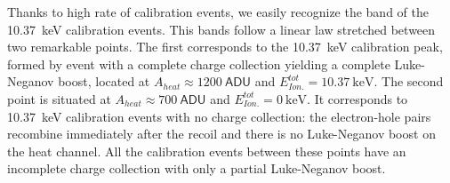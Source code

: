 Thanks to high rate of calibration events, we easily recognize the band of the \SI{10.37}{\kilo\eV} calibration events. This bands follow a linear law stretched between two remarkable points. The first corresponds to the \SI{10.37}{\kilo\eV} calibration peak, formed by event with a complete charge collection yielding a complete Luke-Neganov boost, located at $A_{heat}\approx \SI{1200}{\textsf{ADU}}$ and $E_{Ion.}^{tot} = \SI{10.37}{\kilo\eV}$. The second point is situated at $A_{heat}\approx \SI{700}{\textsf{ADU}}$ and $E_{Ion.}^{tot} = \SI{0}{\kilo\eV}$. It corresponds to \SI{10.37}{\kilo\eV} calibration events with no charge collection: the electron-hole pairs recombine immediately after the recoil and there is no Luke-Neganov boost on the heat channel. All the calibration events between these points have an incomplete charge collection with only a partial Luke-Neganov boost.

